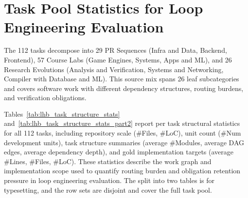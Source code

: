 \section{Task Pool Statistics for Loop Engineering Evaluation}\label{app:per-task-stats}

The 112 \lhb{} tasks decompose into 29 PR Sequences (Infra and Data, Backend, Frontend), 57 Course Labs (Game Engines, Systems, Apps and ML), and 26 Research Evolutions (Analysis and Verification, Systems and Networking, Compiler with Database and ML). This source mix spans 26 leaf subcategories and covers software work with different dependency structures, routing burdens, and verification obligations.

Tables~\ref{tab:lhb_task_structure_stats} and~\ref{tab:lhb_task_structure_stats_part2} report per task structural statistics for all 112 \lhb{} tasks, including repository scale (\#Files, \#LoC), unit count (\#Num development units), task structure summaries (average \#Modules, average DAG edges, average dependency depth), and gold implementation targets (average \#Lines, \#Files, \#LoC). These statistics describe the work graph and implementation scope used to quantify routing burden and obligation retention pressure in loop engineering evaluation. The split into two tables is for typesetting, and the row sets are disjoint and cover the full task pool.


\FloatBarrier
\clearpage
